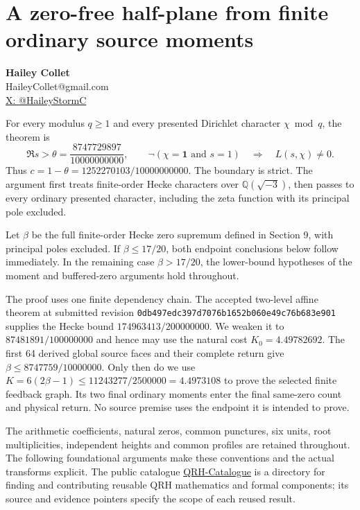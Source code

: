 \hypertarget{frontmatter:a-zero-free-half-plane-from-finite-ordinary-source-moments}{%
\section{A zero-free half-plane from finite ordinary source moments}\label{frontmatter:a-zero-free-half-plane-from-finite-ordinary-source-moments}}

\textbf{Hailey Collet}\\
HaileyCollet@gmail.com\\
\href{https://x.com/HaileyStormC}{X: @HaileyStormC}

For every modulus \(q\ge1\) and every presented Dirichlet character \(\chi\bmod q\), the theorem is \[
 \Re s>\theta=\frac{8747729897}{10000000000},\qquad
 \neg(\chi=\mathbf1\text{ and }s=1)
 \quad\Longrightarrow\quad L(s,\chi)\ne0.
\] Thus \(c=1-\theta=1252270103/10000000000\). The boundary is strict. The argument first treats finite-order Hecke characters over \(\mathbb Q(\sqrt{-3})\), then passes to every ordinary presented character, including the zeta function with its principal pole excluded.

Let \(\beta\) be the full finite-order Hecke zero supremum defined in Section 9, with principal poles excluded. If \(\beta\le17/20\), both endpoint conclusions below follow immediately. In the remaining case \(\beta>17/20\), the lower-bound hypotheses of the moment and buffered-zero arguments hold throughout.

The proof uses one finite dependency chain. The accepted two-level affine theorem at submitted revision \texttt{0db497ed\allowbreak{}c397d707\allowbreak{}6b1652b0\allowbreak{}60e49c76\allowbreak{}b683e901} supplies the Hecke bound \(174963413/200000000\). We weaken it to \(87481891/100000000\) and hence may use the natural cost \(K_0=4.49782692\). The first 64 derived global source faces and their complete return give \(\beta\le8747759/10000000\). Only then do we use \(K=6(2\beta-1)\le11243277/2500000=4.4973108\) to prove the selected finite feedback graph. Its two final ordinary moments enter the final same-zero count and physical return. No source premise uses the endpoint it is intended to prove.

The arithmetic coefficients, natural zeros, common punctures, six units, root multiplicities, independent heights and common profiles are retained throughout. The following foundational arguments make these conventions and the actual transforms explicit. The public catalogue \href{https://github.com/HaileyStorm/QRH-Catalogue}{QRH-Catalogue} is a directory for finding and contributing reusable QRH mathematics and formal components; its source and evidence pointers specify the scope of each reused result.
